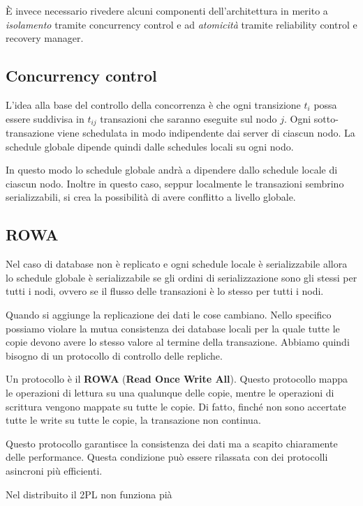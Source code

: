 È invece necessario rivedere alcuni componenti dell'architettura in merito a
\textit{isolamento} tramite concurrency control e ad \textit{atomicità} tramite
reliability control e recovery manager.
\subsection{Concurrency control}
L'idea alla base del controllo della concorrenza è che ogni transizione $t_i$
possa essere suddivisa in $t_{ij}$ transazioni che saranno eseguite sul nodo $j$.
Ogni sotto-transazione viene schedulata in modo indipendente dai server di
ciascun nodo. La schedule globale dipende quindi dalle schedules locali su ogni nodo.

In questo modo lo schedule globale andrà a dipendere dallo schedule locale di
ciascun nodo. Inoltre in questo caso, seppur localmente le transazioni sembrino
serializzabili, si crea la possibilità di avere conflitto a livello globale.
\subsection{ROWA}
Nel caso di database non è replicato e ogni schedule locale è serializzabile 
allora lo schedule globale è serializzabile se gli ordini di serializzazione 
sono gli stessi per tutti i nodi, ovvero se il flusso delle transazioni è lo
stesso per tutti i nodi.

Quando si aggiunge la replicazione dei dati le cose cambiano. Nello specifico 
possiamo violare la mutua consistenza dei database locali per la quale tutte le 
copie devono avere lo stesso valore al termine della transazione. Abbiamo quindi 
bisogno di un protocollo di controllo delle repliche.

Un protocollo è il \textbf{ROWA} (\textbf{Read Once Write All}). Questo 
protocollo mappa le operazioni di lettura su una qualunque delle copie, mentre 
le operazioni di scrittura vengono mappate su tutte le copie. Di fatto, finché 
non sono accertate tutte le write su tutte le copie, la transazione non continua. 

Questo protocollo garantisce la consistenza dei dati ma a scapito chiaramente delle
performance. Questa condizione può essere rilassata con dei protocolli asincroni 
più efficienti.

Nel distribuito il 2PL  non funziona pià